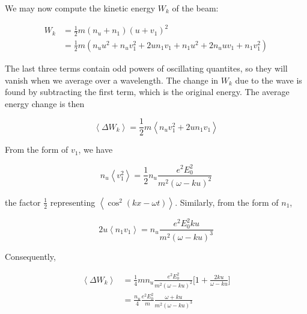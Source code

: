\documentclass[
  notoc %
]{tufte-book}
\begin{document}
We may now compute the kinetic energy \(W_k\) of the beam:

\[
\begin{aligned}
W_k &= \frac{1}{2}m(n_u+n_1)(u+v_1)^2 \\
&= \frac{1}{2}m(n_u u^2 + n_uv_1^2 +2un_1v_1 + n_1u^2 + 2n_uuv_1 + n_1v_1^2)
\end{aligned}
\]

The last three terms contain odd powers of oscillating quantites, so
they will vanish when we average over a wavelength. The change in
\(W_k\) due to the wave is found by subtracting the first term, which is
the original energy. The average energy change is then

\[
\left<\Delta W_k \right> = \frac{1}{2}m\left<n_uv_1^2 + 2un_1v_1\right>
\]

From the form of \(v_1\), we have

\[
n_u\left< v_1^2 \right> = \frac{1}{2}n_u\frac{e^2E_0^2}{m^2(\omega-ku)^2}
\]

the factor \(\frac{1}{2}\) representing
\(\left< \cos^2(kx-\omega t) \right>\). Similarly, from the form of
\(n_1\),

\[
2u\left< n_1v_1 \right> = n_u\frac{e^2E_0^2 ku}{m^2(\omega - ku)^3}
\]

Consequently,

\[
\begin{aligned}
\left<\Delta W_k \right> &= \frac{1}{4}mn_u \frac{e^2E_0^2}{m^2(\omega - ku)^2}\Big[ 1+\frac{2ku}{\omega-ku} \Big] \\
&= \frac{n_u}{4}\frac{e^2E_0^2}{m}\frac{\omega+ku}{m^2(\omega - ku)^3}
\end{aligned}
\]
\end{document}
